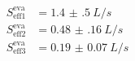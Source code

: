 \begin{align}
  S_\text{eff1}^\text{eva} &= \qty{1.4(5)}{L/s} \\
  S_\text{eff2}^\text{eva} &= \qty{0.48(16)}{L/s} \\
  S_\text{eff3}^\text{eva} &= \qty{0.19(7)}{L/s}
\end{align}



